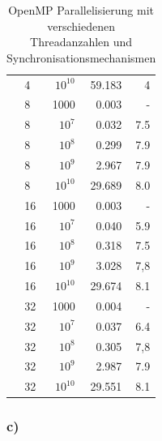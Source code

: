 \documentclass{report}
\begin{document}
\begin{table}
\begin{tabular}{|l|l|r|r|r|}
		 & 4 & $10^{10}$ & 59.183 & 4 \\
		 & 8 & 1000 & 0.003 & - \\
		 & 8 & $ 10^{7} $ & 0.032 & 7.5 \\
		 & 8 & $ 10^{8} $ & 0.299 & 7.9 \\
		 & 8 & $ 10^{9} $ & 2.967 & 7.9 \\
		 & 8 & $10^{10}$ & 29.689 & 8.0 \\
		 & 16 & 1000 & 0.003 & - \\
		 & 16 & $ 10^{7} $ & 0.040 & 5.9 \\
		 & 16 & $ 10^{8} $ & 0.318 & 7.5 \\
		 & 16 & $ 10^{9} $ & 3.028 & 7,8 \\
		 & 16 & $10^{10}$ & 29.674 & 8.1\\
		 & 32 & 1000 & 0.004 & - \\
		 & 32 & $ 10^{7} $ & 0.037 & 6.4 \\
		 & 32 & $ 10^{8} $ & 0.305 & 7,8 \\
		 & 32 & $ 10^{9} $ & 2.987 & 7.9 \\
		 & 32 & $10^{10}$ & 29.551 & 8.1 \\
		\hline
	\end{tabular}
	\caption{OpenMP Parallelisierung mit verschiedenen Threadanzahlen und Synchronisationsmechanismen}
	\label{Table:1b}
\end{table}
	\newpage
        \subsubsection{c)}
        
\end{document}
